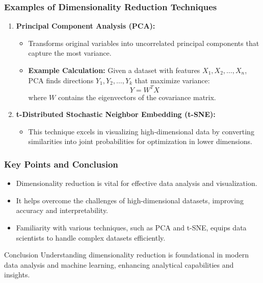 \documentclass[aspectratio=169]{beamer}
\begin{document}
\begin{frame}[fragile]
    \frametitle{Examples of Dimensionality Reduction Techniques}
    \begin{enumerate}
        \item \textbf{Principal Component Analysis (PCA):}
        \begin{itemize}
            \item Transforms original variables into uncorrelated principal components that capture the most variance.
            \item \textbf{Example Calculation:} Given a dataset with features \(X_1, X_2, \dots, X_n\), PCA finds directions \(Y_1, Y_2, \dots, Y_k\) that maximize variance:
                \begin{equation}
                    Y = W^T X
                \end{equation}
                where \(W\) contains the eigenvectors of the covariance matrix.
        \end{itemize}
        
        \item \textbf{t-Distributed Stochastic Neighbor Embedding (t-SNE):}
        \begin{itemize}
            \item This technique excels in visualizing high-dimensional data by converting similarities into joint probabilities for optimization in lower dimensions.
        \end{itemize}
    \end{enumerate}
\end{frame}

\begin{frame}[fragile]
    \frametitle{Key Points and Conclusion}
    \begin{itemize}
        \item Dimensionality reduction is vital for effective data analysis and visualization.
        \item It helps overcome the challenges of high-dimensional datasets, improving accuracy and interpretability.
        \item Familiarity with various techniques, such as PCA and t-SNE, equips data scientists to handle complex datasets efficiently.
    \end{itemize}
    
    \begin{block}{Conclusion}
        Understanding dimensionality reduction is foundational in modern data analysis and machine learning, enhancing analytical capabilities and insights.
    \end{block}
\end{frame}
\end{document}

